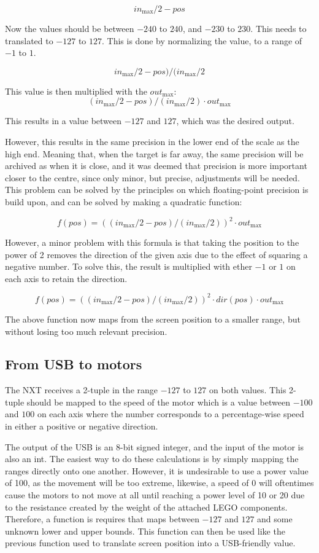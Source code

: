 $$
in_\text{max}/2 - pos
$$

Now the values should be between $-240$ to $240$, and $-230$ to $230$.
This needs to translated to $-127$ to $127$.
This is done by normalizing the value, to a range of $-1$ to $1$.

$$
in_\text{max}/2 - pos)/(in_\text{max}/2
$$


This value is then multiplied with the $out_\text{max}$:
$$
(in_\text{max}/2 - pos)/(in_\text{max}/2) \cdot out_\text{max}
$$

This results in a value between $-127$ and $127$, which was the desired output.


However, this results in the same precision in the lower end of the scale as the high end.
Meaning that, when the target is far away, the same precision will be archived as when it is close, and it was deemed that precision is more important closer to the centre, since only minor, but precise, adjustments will be needed.
This problem can be solved by the principles on which floating-point precision is build upon, and can be solved by making a quadratic function:

$$
f(pos) = ((in_\text{max}/2 - pos)/(in_\text{max}/2))^2 \cdot out_\text{max}
$$

However, a minor problem with this formula is that taking the position to the power of 2 removes the direction of the given axis due to the effect of squaring a negative number.
To solve this, the result is multiplied with ether $-1$ or $1$ on each axis to retain the direction.

$$
f(pos) = ((in_\text{max}/2 - pos)/(in_\text{max}/2))^2 \cdot dir(pos) \cdot out_\text{max}
$$

The above function now maps from the screen position to a smaller range, but without losing too much relevant precision.

\subsection{From USB to motors}
The NXT receives a 2-tuple in the range $-127$ to $127$ on both values.
This 2-tuple should be mapped to the speed of the motor which is a value between $-100$ and $100$ on each axis where the number corresponds to a percentage-wise speed in either a positive or negative direction. 

The output of the USB is an 8-bit signed integer, and the input of the motor is also an int.
The easiest way to do these calculations is by simply mapping the ranges directly onto one another.
However, it is undesirable to use a power value of 100, as the movement will be too extreme, likewise, a speed of 0 will oftentimes cause the motors to not move at all until reaching a power level of 10 or 20 due to the resistance created by the weight of the attached LEGO components.
Therefore, a function is requires that maps between $-127$ and $127$ and some unknown lower and upper bounds.
This function can then be used like the previous function used to translate screen position into a USB-friendly value.

